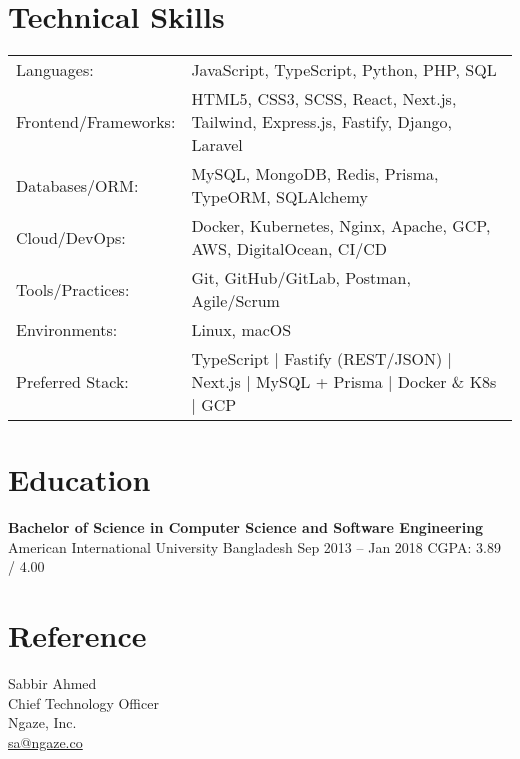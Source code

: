 \documentclass[a4paper,10pt]{article}
\begin{document}
\section*{Technical Skills}
\begin{tabular}{@{}ll}
Languages: & JavaScript, TypeScript, Python, PHP, SQL \\
Frontend/Frameworks: & HTML5, CSS3, SCSS, React, Next.js, Tailwind, Express.js, Fastify, Django, Laravel \\
Databases/ORM: & MySQL, MongoDB, Redis, Prisma, TypeORM, SQLAlchemy \\
Cloud/DevOps: & Docker, Kubernetes, Nginx, Apache, GCP, AWS, DigitalOcean, CI/CD \\
Tools/Practices: & Git, GitHub/GitLab, Postman, Agile/Scrum \\
Environments: & Linux, macOS \\
Preferred Stack: & TypeScript | Fastify (REST/JSON) | Next.js | MySQL + Prisma | Docker \& K8s | GCP \\
\end{tabular}

\section*{Education}
\textbf{Bachelor of Science in Computer Science and Software Engineering}\\
American International University Bangladesh \hfill Sep 2013 -- Jan 2018 \hspace{1em} CGPA: 3.89 / 4.00

\vspace{2pt}

\section*{Reference}
Sabbir Ahmed \\
Chief Technology Officer \\
Ngaze, Inc. \\
\href{mailto:sa@ngaze.co}{sa@ngaze.co}
\end{document}
